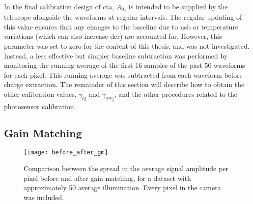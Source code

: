In the final calibration design of \gls{cta}, ${A_0}_i$ is intended to be supplied by the telescope alongside the waveforms at regular intervals. The regular updating of this value ensures that any changes to the baseline due to \gls{nsb} or temperature variations (which can also increase \gls{dcr}) are accounted for. However, this parameter was set to zero for the content of this thesis, and was not investigated. Instead, a less effective but simpler baseline subtraction was performed by monitoring the running average of the first 16 samples of the past 50 waveforms for each pixel. This running average was subtracted from each waveform before charge extraction. The remainder of this section will describe how to obtain the other calibration values, $\gamma_{Q}$ and ${\gamma_{FF}}_i$, and the other procedures related to the photosensor calibration.

\subsection{Gain Matching}

\begin{figure}
	\centering
    \texttt{[image: before\_after\_gm]} 
	\caption[Gain-Matching Residuals]{Comparison between the spread in the average signal amplitude per pixel before and after gain matching, for a dataset with approximately \SI{50}{\pe} average illumination. Every pixel in the camera was included.} 
	\label{fig:before_after_gm}
\end{figure}

